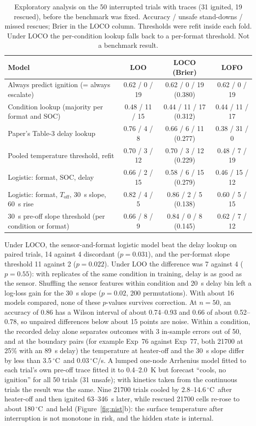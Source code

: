 \documentclass[11pt]{article}
\newcommand{\degC}{\,$^\circ$C}
\begin{document}
\begin{table}[t]
\centering\small
\caption{Exploratory analysis on the 50 interrupted trials with traces (31 ignited, 19 rescued), before the benchmark
was fixed. Accuracy / unsafe stand-downs / missed rescues; Brier in the LOCO column. Thresholds were refit inside each
fold. Under LOCO the per-condition lookup falls back to a per-format threshold. Not a benchmark result.}
\label{tab:exploratory}
\setlength{\tabcolsep}{3pt}
\begin{tabular}{@{}lccc@{}}
\toprule
Model & LOO & LOCO (Brier) & LOFO \\
\midrule
Always predict ignition (= always escalate) & 0.62 / 0 / 19 & 0.62 / 0 / 19 (0.380) & 0.62 / 0 / 19 \\
Condition lookup (majority per format and SOC) & 0.48 / 11 / 15 & 0.44 / 11 / 17 (0.312) & 0.44 / 11 / 17 \\
Paper's Table-3 delay lookup & 0.76 / 4 / 8 & 0.66 / 6 / 11 (0.277) & 0.38 / 31 / 0 \\
Pooled temperature threshold, refit & 0.70 / 3 / 12 & 0.70 / 3 / 12 (0.229) & 0.48 / 7 / 19 \\
Logistic: format, SOC, delay & 0.66 / 2 / 15 & 0.58 / 6 / 15 (0.279) & 0.46 / 15 / 12 \\
Logistic: format, $T_\text{off}$, 30~s slope, 60~s rise & 0.82 / 4 / 5 & 0.86 / 2 / 5 (0.138) & 0.60 / 5 / 15 \\
30~s pre-off slope threshold (per condition or format) & 0.66 / 8 / 9 & 0.84 / 0 / 8 (0.145) & 0.62 / 7 / 12 \\
\bottomrule
\end{tabular}
\end{table}

Under LOCO, the sensor-and-format logistic model beat the delay lookup on paired trials, 14 against 4 discordant
($p = 0.031$), and the per-format slope threshold 11 against 2 ($p = 0.022$). Under LOO the difference was 7 against 4
($p = 0.55$): with replicates of the same condition in training, delay is as good as the sensor. Shuffling the sensor
features within condition and 20~s delay bin left a log-loss gain for the 30~s slope ($p = 0.02$, 200 permutations).
With about 16 models compared, none of these $p$-values survives correction. At $n = 50$, an accuracy of 0.86 has a
Wilson interval of about 0.74--0.93 and 0.66 of about 0.52--0.78, so unpaired differences below about 15 points are
noise. Within a condition, the recorded delay alone separates outcomes with 3 in-sample errors out of 50, and at the
boundary pairs (for example Exp~76 against Exp~77, both 21700 at 25\% with an 89~s delay) the temperature at heater-off
and the 30~s slope differ by less than 3.5\degC\ and 0.03\degC/s. A lumped one-node Arrhenius model fitted to each
trial's own pre-off trace fitted it to 0.4--2.0~K but forecast ``cools, no ignition'' for all 50 trials (31 unsafe);
with kinetics taken from the continuous trials the result was the same. Nine 21700 trials cooled by 2.8--14.6\degC\
after heater-off and then ignited 63--346~s later, while rescued 21700 cells re-rose to about 180\degC\ and held
(Figure~\ref{fig:nist}b): the surface temperature after interruption is not monotone in risk, and the hidden state is
internal.
\end{document}
